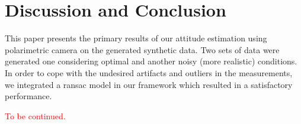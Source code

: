 \section{Discussion and Conclusion}
\label{sec:dis-con}

This paper presents the primary results of our attitude estimation using
polarimetric camera on the generated synthetic data.  Two sets of data were
generated one considering optimal and another noisy (more realistic)
conditions. In order to cope with the undesired artifacts and outliers in the
measurements, we integrated a ransac model in our framework which resulted in a
satisfactory performance.

\textcolor{red}{To be continued.}



